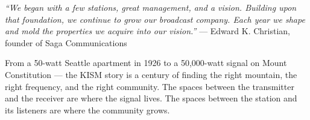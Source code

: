 \documentclass[11pt,letterpaper]{article}
\begin{document}
\vspace{1em}

\begin{quotebox}
\textit{``We began with a few stations, great management, and a vision. Building upon that foundation, we continue to grow our broadcast company. Each year we shape and mold the properties we acquire into our vision.''} --- Edward K. Christian, founder of Saga Communications

\vspace{0.5em}

From a 50-watt Seattle apartment in 1926 to a 50,000-watt signal on Mount Constitution --- the KISM story is a century of finding the right mountain, the right frequency, and the right community. The spaces between the transmitter and the receiver are where the signal lives. The spaces between the station and its listeners are where the community grows.
\end{quotebox}
\end{document}

